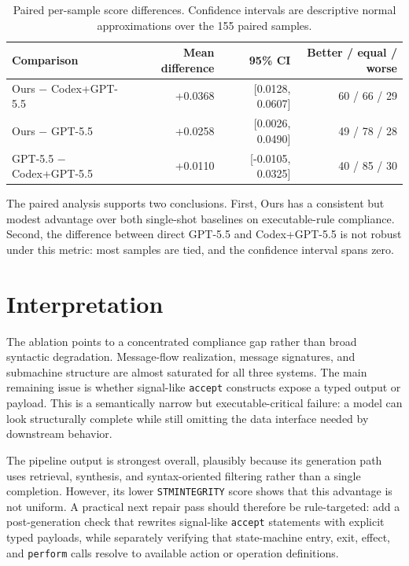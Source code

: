 \documentclass[11pt]{article}
\newcommand{\code}[1]{\texttt{\small #1}}
\begin{document}
\begin{table}[h]
\centering
\caption{Paired per-sample score differences. Confidence intervals are
descriptive normal approximations over the 155 paired samples.}
\begin{tabular}{lrrr}
\toprule
Comparison & Mean difference & 95\% CI & Better / equal / worse \\
\midrule
Ours $-$ Codex+GPT-5.5 & +0.0368 & [0.0128, 0.0607] & 60 / 66 / 29 \\
Ours $-$ GPT-5.5 & +0.0258 & [0.0026, 0.0490] & 49 / 78 / 28 \\
GPT-5.5 $-$ Codex+GPT-5.5 & +0.0110 & [-0.0105, 0.0325] & 40 / 85 / 30 \\
\bottomrule
\end{tabular}
\end{table}

The paired analysis supports two conclusions. First, Ours has a consistent but
modest advantage over both single-shot baselines on executable-rule compliance.
Second, the difference between direct GPT-5.5 and Codex+GPT-5.5 is not robust
under this metric: most samples are tied, and the confidence interval spans
zero.

\section{Interpretation}

The ablation points to a concentrated compliance gap rather than broad
syntactic degradation. Message-flow realization, message signatures, and
submachine structure are almost saturated for all three systems. The main
remaining issue is whether signal-like \code{accept} constructs expose a typed
output or payload. This is a semantically narrow but executable-critical
failure: a model can look structurally complete while still omitting the data
interface needed by downstream behavior.

The pipeline output is strongest overall, plausibly because its generation path
uses retrieval, synthesis, and syntax-oriented filtering rather than a single
completion. However, its lower \code{STMINTEGRITY} score shows that this
advantage is not uniform. A practical next repair pass should therefore be
rule-targeted: add a post-generation check that rewrites signal-like
\code{accept} statements with explicit typed payloads, while separately
verifying that state-machine entry, exit, effect, and \code{perform} calls
resolve to available action or operation definitions.
\end{document}
